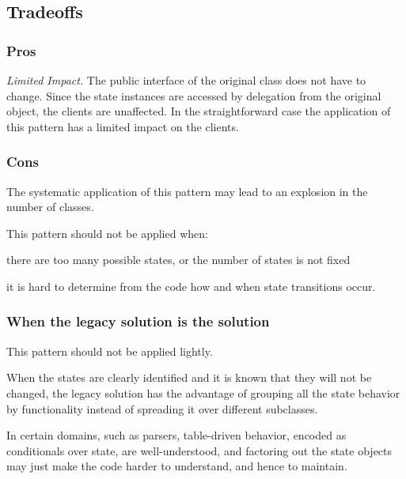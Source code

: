 \documentclass[a4paper,10pt,twoside]{book}
\begin{document}
\subsection*{Tradeoffs}

\subsubsection*{Pros}

\begin{bulletlist}
\item \emph{Limited Impact.} The public interface of the original class does not have to change. Since the state instances are accessed by delegation from the original object, the clients are unaffected. In the straightforward case the application of this pattern has a limited impact on the clients. 
\end{bulletlist}

\subsubsection*{Cons}

\begin{bulletlist}
\item The systematic application of this pattern may lead to an explosion in the number of classes.

\item This pattern should not be applied when:

	\begin{bulletlist}
	\item there are too many possible states, or the number of states is not fixed
	\item it is hard to determine from the code how and when state transitions occur.
	\end{bulletlist}
\end{bulletlist}

\subsubsection*{When the legacy solution is the solution}

This pattern should not be applied lightly.

\begin{bulletlist}
\item When the states are clearly identified and it is known that they will not be changed, the legacy solution has the advantage of grouping all the state behavior by functionality instead of spreading it over different subclasses.

\item In certain domains, such as parsers, table-driven behavior, encoded as conditionals over state, are well-understood, and factoring out the state objects may just make the code harder to understand, and hence to maintain.
\end{bulletlist}
\end{document}
